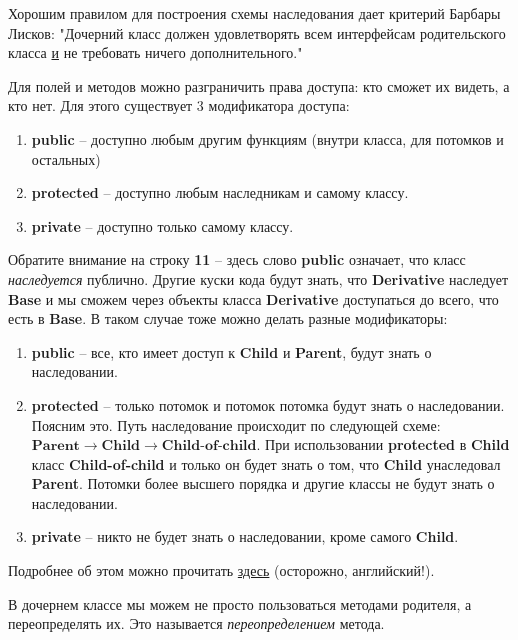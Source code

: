 \begin{lecture}[\lectureSubject]
\begin{lecSection}
		Хорошим правилом для построения схемы наследования дает критерий Барбары Лисков: "Дочерний класс должен удовлетворять всем интерфейсам родительского класса \underline{и} не требовать ничего дополнительного."
	\end{lecSection}
	\begin{lecSection}
		Для полей и методов можно разграничить права доступа: кто сможет их видеть, а кто нет. Для этого существует 3 модификатора доступа:
		\begin{enumerate}
			\item \textbf{public} -- доступно любым другим функциям (внутри класса, для потомков и остальных)
			\item \textbf{protected} -- доступно любым наследникам и самому классу.
			\item \textbf{private} -- доступно только самому классу.
		\end{enumerate}
		Обратите внимание на строку \textbf{11} -- здесь слово \textbf{public} означает, что класс \textit{наследуется} публично. Другие куски кода будут знать, что \textbf{Derivative} наследует \textbf{Base} и мы сможем через объекты класса \textbf{Derivative} доступаться до всего, что есть в \textbf{Base}. В таком случае тоже можно делать разные модификаторы:
		\begin{enumerate}
			\item \textbf{public} -- все, кто имеет доступ к \textbf{Child} и \textbf{Parent}, будут знать о наследовании.
			\item \textbf{protected} -- только потомок и потомок потомка будут знать о наследовании. Поясним это. Путь наследование происходит по следующей схеме: $\textbf{Parent} \rightarrow \textbf{Child} \rightarrow \textbf{Child-of-child}$. При использовании \textbf{protected} в \textbf{Child} класс \textbf{Child-of-child} и только он будет знать о том, что \textbf{Child} унаследовал \textbf{Parent}. Потомки более высшего порядка и другие классы не будут знать о наследовании.
			\item \textbf{private} -- никто не будет знать о наследовании, кроме самого \textbf{Child}.
		\end{enumerate}
		Подробнее об этом можно прочитать \href{https://stackoverflow.com/questions/860339/difference-between-private-public-and-protected-inheritance}{здесь} (осторожно, английский!).
	\end{lecSection}
	\begin{lecSection}
		В дочернем классе мы можем не просто пользоваться методами родителя, а переопределять их. Это называется \textit{переопределением} метода.
		

\end{lecSection}
\end{lecture}
